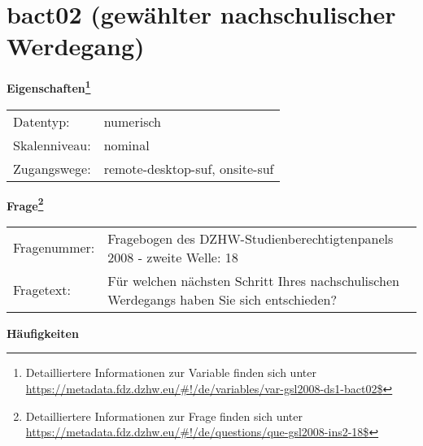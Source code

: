 
    \setcounter{footnote}{0}

    \vspace*{-1.8cm}
	\section{bact02 (gewählter nachschulischer Werdegang)}
	\label{section:bact02}



    \vspace*{0.5cm}
    \noindent\textbf{Eigenschaften\footnote{Detailliertere Informationen zur Variable finden sich unter
		\url{https://metadata.fdz.dzhw.eu/\#!/de/variables/var-gsl2008-ds1-bact02$}}}\\
	\begin{tabularx}{\hsize}{@{}lX}
	Datentyp: & numerisch \\
	Skalenniveau: & nominal \\
	Zugangswege: &
	  remote-desktop-suf, 
	  onsite-suf
 \\
    \end{tabularx}



				\vspace*{0.5cm}
                \noindent\textbf{Frage\footnote{Detailliertere Informationen zur Frage finden sich unter
		              \url{https://metadata.fdz.dzhw.eu/\#!/de/questions/que-gsl2008-ins2-18$}}}\\
				\begin{tabularx}{\hsize}{@{}lX}
					Fragenummer: &
					  Fragebogen des DZHW-Studienberechtigtenpanels 2008 - zweite Welle:
					  18
 \\
					Fragetext: & Für welchen nächsten Schritt Ihres nachschulischen Werdegangs haben Sie sich entschieden? \\
				\end{tabularx}





        		\vspace*{0.5cm}
                \noindent\textbf{Häufigkeiten}

